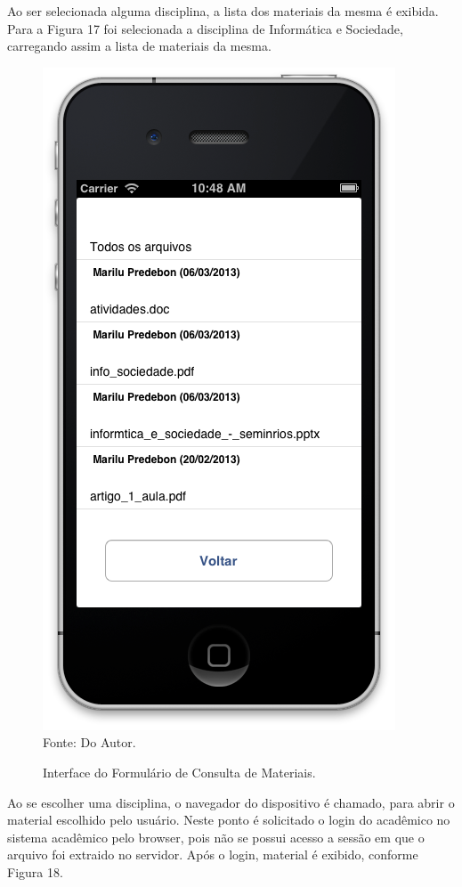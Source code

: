 Ao ser selecionada alguma disciplina, a lista dos materiais da mesma é exibida. Para a Figura 17 foi selecionada a disciplina de Informática e Sociedade, carregando assim a lista de materiais da mesma.

\begin{figure}[!htb]
     \centering
     \caption[Formulário Material de Apoio - Consulta de Materiais]{Interface do Formulário de Consulta de Materiais.}
     \includegraphics[scale=0.34]{imagens/formmaterialdisciplina.png}
     \\  Fonte: Do Autor.
\end{figure}
\newpage

Ao se escolher uma disciplina, o navegador do dispositivo é chamado, para abrir o material escolhido pelo usuário. Neste ponto é solicitado o login do acadêmico no sistema acadêmico pelo browser, pois não se possui acesso a sessão em que o arquivo foi extraido no servidor. Após o login, material é exibido, conforme Figura 18.

